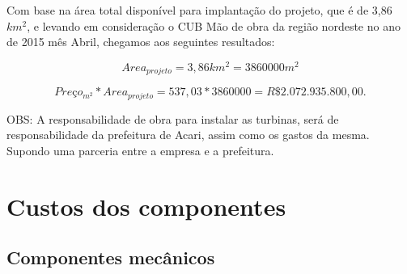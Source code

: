 	Com base na área total disponível para implantação do projeto, que é de 3,86 $km^2$, e levando em consideração o CUB Mão de obra da região nordeste no ano de 2015 mês Abril, chegamos aos seguintes resultados:
	
	$$ Area_{projeto} = 3,86 km^2 = 3860000 m^2$$
	
	$$ Preço_{m^2} * Area_{projeto} = 537,03 * 3860000 = R\$ 2.072.935.800,00.$$
	
	OBS: A responsabilidade de obra para instalar as turbinas, será de responsabilidade da prefeitura de Acari, assim como os gastos da mesma. Supondo uma parceria entre a empresa e a prefeitura.
    
    \vfill
    \pagebreak
    \section{Custos dos componentes}
      
      \subsection{Componentes mecânicos}
	
